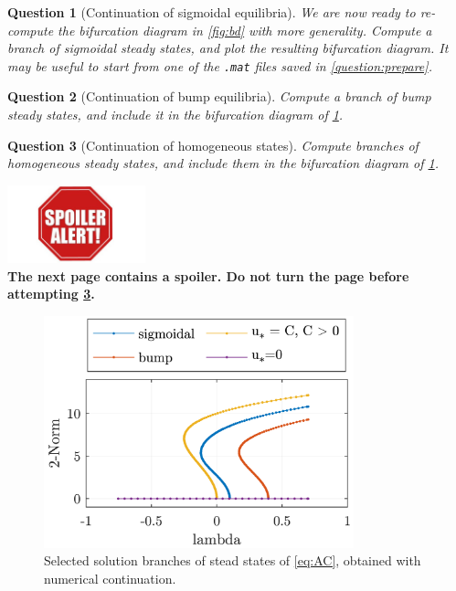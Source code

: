 \documentclass[a4paper]{siamart220329}
\theoremstyle{plain}
\newtheorem{question}{Question}
\begin{document}
  \begin{question}[Continuation of sigmoidal equilibria] \label{question:sigmoidalBranch}
    We are now ready to re-compute the bifurcation diagram in \cref{fig:bd} with more
    generality. Compute a branch of sigmoidal
    steady states, and plot the resulting bifurcation diagram. It may be useful
    to start from one of the \lstinline|.mat| files saved in \cref{question:prepare}.
  \end{question} 

  \begin{question}[Continuation of bump equilibria]
    Compute a branch of bump steady states, and include it in the bifurcation diagram
    of \cref{question:sigmoidalBranch}.
  \end{question} 

  \begin{question}[Continuation of homogeneous states]\label{question:homBranch}
    Compute branches of homogeneous steady states, and include them in the bifurcation diagram
    of \cref{question:sigmoidalBranch}.
  \end{question} 

\vspace{3cm}
\begin{center}
  \includegraphics[width = 0.3\textwidth]{spoiler}\\
  \textbf{The next page contains a spoiler. Do not turn the page before
  attempting \cref{question:homBranch}.}
\end{center}
\newpage

\begin{figure}
  \centering
  \includegraphics[width=0.8\textwidth]{bd}
  \caption{Selected solution branches of stead states of \cref{eq:AC}, obtained with
  numerical continuation.}
  \label{fig:bdCont}
\end{figure}
\end{document}
